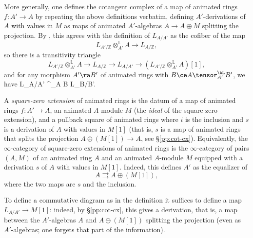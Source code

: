 More generally, one defines the cotangent complex of a map of animated rings $f\colon A'\to A$ by repeating the above definitions verbatim, defining $A'$-derivations of $A$ with values in $M$ as maps of animated $A'$-algebras $A\to A\oplus M$ splitting the projection. By \cite[Remark~25.3.2.4]{SAG}, this agrees with the definition of $L_{A/A'}$ %
as the cofiber of the map
\[
L_{A'/\mathbb Z}\otimes^{\mathbb L}_{A'} A\to L_{A/\mathbb Z},
\]
so there is a transitivity triangle
\[
L_{A'/\mathbb Z}\otimes^{\mathbb L}_{A'} A\to L_{A/\mathbb Z}\to L_{A/A'}\to (L_{A'/\mathbb Z}\otimes^{\mathbb L}_{A'} A)[1],
\]
and for any morphism $A' \ra B'$ of animated rings with $B \ce A \tensor^\bL_{A'} B'$, we have
\be \label{cot-cx-bc}
L_{A/A'} \tensor^\bL_A B \cong L_{B/B'}.
\ee
\epp




 \label{pp:sq-zero}
A \emph{square-zero extension} of animated rings is the datum of a map of animated rings $f\colon A'\to A$, an animated $A$-module $M$ (the \emph{ideal} of the square-zero extension), and a pullback square of animated rings
\be\label{sq-zero}
\ba{}\ea\ee
where $i$ is the inclusion and $s$ is a derivation of $A$ with values in $M[1]$ (that is, $s$ is a map  of animated rings that splits the projection $A\oplus (M[1]) \to A$, see \S\ref{pp:cot-cx}). Equivalently, the $\infty$-category of square-zero extensions of animated rings is the $\infty$-category of pairs $(A,M)$ of an animated ring $A$ and an animated $A$-module $M$ equipped with a derivation $s$ of $A$ with values in $M[1]$.
Indeed, this defines $A'$ as the equalizer of
\[
A\rightrightarrows A\oplus (M[1]),
\]
where the two maps are $s$ and the inclusion.

To define a commutative diagram as in the definition it suffices to define a map $L_{A/A'}\to M[1]$: indeed, by \S\ref{pp:cot-cx}, this gives a derivation, that is, a map between the $A'$-algebras $A$ and $A\oplus (M[1])$ splitting the projection (even as $A'$-algebras; one forgets that part of the information).
\epp



